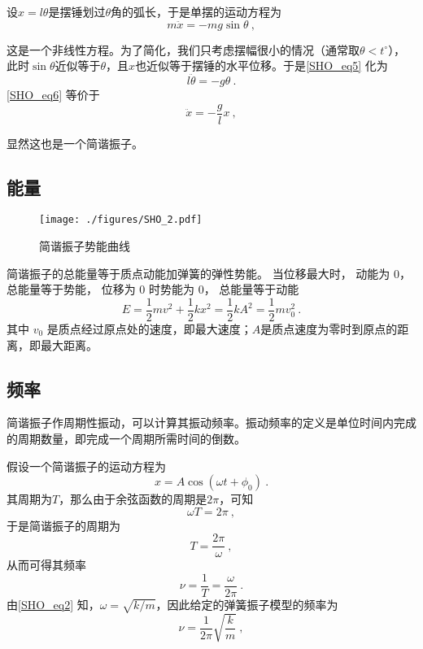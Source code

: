 设$x=l\theta$是摆锤划过$\theta$角的弧长，于是单摆的运动方程为
\begin{equation}\label{SHO_eq5}
m\ddot{x} = -mg\sin\theta~,
\end{equation}

这是一个非线性方程。为了简化，我们只考虑摆幅很小的情况（通常取$\theta<t^\circ$），此时$\sin\theta$近似等于$\theta$，且$x$也近似等于摆锤的水平位移。于是\autoref{SHO_eq5} 化为
\begin{equation}\label{SHO_eq6}
l\ddot{\theta} = -g\theta~.
\end{equation}
\autoref{SHO_eq6} 等价于
\begin{equation}\label{SHO_eq7}
\ddot{x} = -\frac{g}{l}x~,
\end{equation}

显然这也是一个简谐振子。



\subsection{能量}

\begin{figure}[ht]
\centering
\texttt{[image: ./figures/SHO\_2.pdf]}
\caption{简谐振子势能曲线} \label{SHO_fig2}
\end{figure}

简谐振子的总能量等于质点动能加弹簧的弹性势能。 当位移最大时， 动能为 0， 总能量等于势能， 位移为 0 时势能为 0， 总能量等于动能
\begin{equation}
E = \frac{1}{2} mv^2 + \frac12 k x^2 = \frac12 k A^2 = \frac12 m v_0^2~.
\end{equation}
其中 $v_0$ 是质点经过原点处的速度，即最大速度；$A$是质点速度为零时到原点的距离，即最大距离。


\subsection{频率}

简谐振子作周期性振动，可以计算其振动频率。振动频率的定义是单位时间内完成的周期数量，即完成一个周期所需时间的倒数。

假设一个简谐振子的运动方程为
\begin{equation}
x = A\cos(\omega t+\phi_0)~.
\end{equation}
其周期为$T$，那么由于余弦函数的周期是$2\pi$，可知
\begin{equation}
\omega T = 2\pi~,
\end{equation}
于是简谐振子的周期为
\begin{equation}
T = \frac{2\pi}{\omega}~,
\end{equation}
从而可得其频率
\begin{equation}
\nu = \frac{1}{T} = \frac{\omega}{2\pi}~.
\end{equation}
由\autoref{SHO_eq2} 知，$\omega=\sqrt{k/m}$，因此给定的弹簧振子模型的频率为
\begin{equation}
\nu = \frac{1}{2\pi}\sqrt{\frac{k}{m}}~,
\end{equation}

